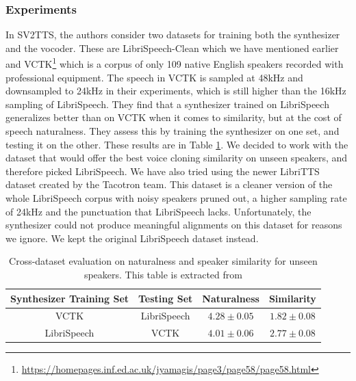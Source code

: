 \documentclass[a4paper, oneside, 12pt, english]{article}
\begin{document}
\subsubsection{Experiments}
In SV2TTS, the authors consider two datasets for training both the synthesizer and the vocoder. These are LibriSpeech-Clean which we have mentioned earlier and VCTK\footnote{\url{https://homepages.inf.ed.ac.uk/jyamagis/page3/page58/page58.html}} which is a corpus of only 109 native English speakers recorded with professional equipment. The speech in VCTK is sampled at 48kHz and downsampled to 24kHz in their experiments, which is still higher than the 16kHz sampling of LibriSpeech. They find that a synthesizer trained on LibriSpeech generalizes better than on VCTK when it comes to similarity, but at the cost of speech naturalness. They assess this by training the synthesizer on one set, and testing it on the other. These results are in Table \ref{libri_vctk_cross}. We decided to work with the dataset that would offer the best voice cloning similarity on unseen speakers, and therefore picked LibriSpeech. We have also tried using the newer LibriTTS~\citep{LibriTTS} dataset created by the Tacotron team. This dataset is a cleaner version of the whole LibriSpeech corpus with noisy speakers pruned out, a higher sampling rate of 24kHz and the punctuation that LibriSpeech lacks. Unfortunately, the synthesizer could not produce meaningful alignments on this dataset for reasons we ignore. We kept the original LibriSpeech dataset instead.

\begin{table}[h]
	\begin{center}
		\begin{small}
			\begin{tabular}{cccc}
				\toprule
				Synthesizer Training Set & Testing Set & Naturalness & Similarity \\
				\midrule
				VCTK & LibriSpeech & $4.28 \pm 0.05$ & $1.82 \pm 0.08$ \\
				LibriSpeech & VCTK & $4.01 \pm 0.06$ & $2.77 \pm 0.08$ \\
				\bottomrule
			\end{tabular}
		\end{small}
	\end{center}
	\caption{Cross-dataset evaluation on naturalness and speaker similarity for unseen speakers. This table is extracted from \citep{SV2TTS}}
	\label{libri_vctk_cross}
\end{table}
\end{document}
